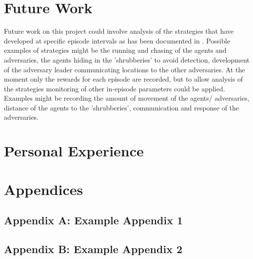 \documentclass{article}
\begin{document}
\section{Future Work} \label{Future Work}

Future work on this project could involve analysis of the strategies that have developed at specific episode intervals as has been documented in \citet{emergenttoolusage}.
Possible examples of strategies might be the running and chasing of the agents and adversaries, the agents hiding in the 'shrubberies' to avoid detection, development of the adversary leader communicating locations to the other adversaries.
At the moment only the rewards for each episode are recorded, but to allow analysis of the strategies monitoring of other in-episode parameters could be applied.
Examples might be recording the amount of movement of the agents/ adversaries, distance of the agents to the 'shrubberies', communication and response of the adversaries.


\section{Personal Experience} \label{Personal Experience}




\small

\normalsize
\newpage
\section*{Appendices}
\subsection*{Appendix A: Example Appendix 1}
\subsection*{Appendix B: Example Appendix 2}
\end{document}
